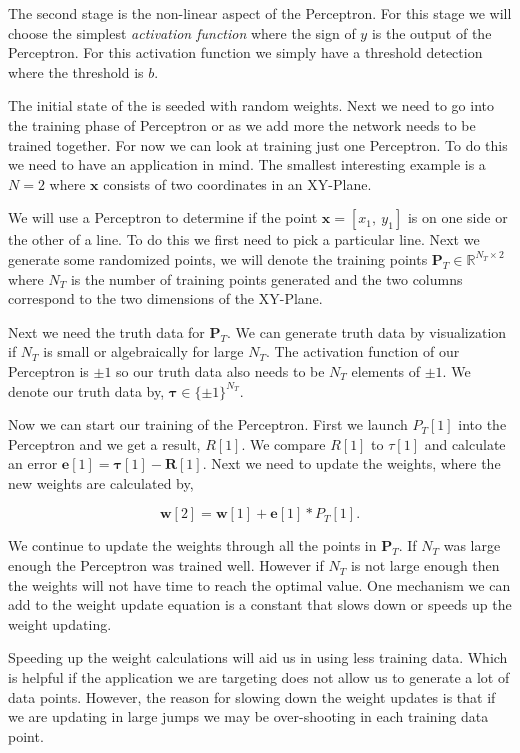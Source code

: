 The second stage is the non-linear aspect of the Perceptron. For this stage we will choose the simplest \emph{activation function} where the sign of $y$ is the output of the Perceptron. For this activation function we simply have a threshold detection where the threshold is $b$. 

The initial state of the  is seeded with random weights. Next we need to go into the training phase of Perceptron or as we add more the network needs to be trained together. For now we can look at training just one Perceptron. To do this we need to have an application in mind. The smallest interesting example is a $N=2$ where $\mathbf{x}$ consists of two coordinates in an XY-Plane. 

We will use a Perceptron to determine if the point $\mathbf{x}=[x_1,~y_1]$ is on one side or the other of a line. To do this we first need to pick a particular line. Next we generate some randomized points, we will denote the training points $\mathbf{P}_T\in \mathbb{R}^{N_T\times 2}$ where $N_T$ is the number of training points generated and the two columns correspond to the two dimensions of the XY-Plane. 

Next we need the truth data for $\mathbf{P}_T$. We can generate truth data by visualization if $N_T$ is small or algebraically for large $N_T$. The activation function of our Perceptron is $\pm1$ so our truth data also needs to be $N_T$ elements of $\pm1$. We denote our truth data by, $\mathbf{\tau}\in \{\pm1\}^{N_T}$. 

Now we can start our training of the Perceptron. First we launch $P_T[1]$ into the Perceptron and we get a result, $R[1]$. We compare $R[1]$ to $\tau[1]$ and calculate an error $\mathbf{e}[1] = \mathbf{\tau}[1]-\mathbf{R}[1]$. Next we need to update the weights, where the new weights are calculated by,

\begin{equation}
\mathbf{w}[2] = \mathbf{w}[1] + \mathbf{e}[1]*P_T[1].
\end{equation}

We continue to update the weights through all the points in $\mathbf{P}_T$. If $N_T$ was large enough the Perceptron was trained well. However if $N_T$ is not large enough then the weights will not have time to reach the optimal value. One mechanism we can add to the weight update equation is a constant that slows down or speeds up the weight updating. 

Speeding up the weight calculations will aid us in using less training data. Which is helpful if the application we are targeting does not allow us to generate a lot of data points. However, the reason for slowing down the weight updates is that if we are updating in large jumps we may be over-shooting in each training data point.

